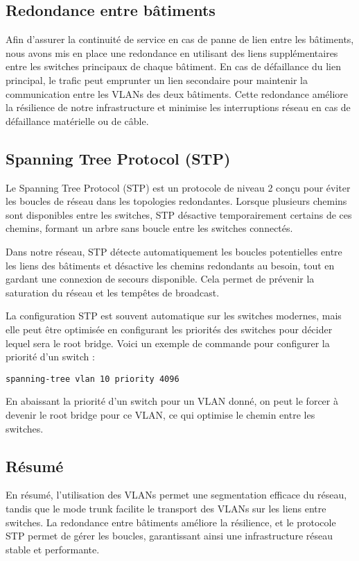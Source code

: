 \documentclass[a4paper,12pt]{report}
\begin{document}
            \subsection{Redondance entre bâtiments}
                Afin d'assurer la continuité de service en cas de panne de lien entre les bâtiments, nous avons mis en place une redondance en utilisant des liens supplémentaires entre les switches principaux de chaque bâtiment. En cas de défaillance du lien principal, le trafic peut emprunter un lien secondaire pour maintenir la communication entre les VLANs des deux bâtiments. Cette redondance améliore la résilience de notre infrastructure et minimise les interruptions réseau en cas de défaillance matérielle ou de câble.

            \subsection{Spanning Tree Protocol (STP)}
                Le Spanning Tree Protocol (STP) est un protocole de niveau 2 conçu pour éviter les boucles de réseau dans les topologies redondantes. Lorsque plusieurs chemins sont disponibles entre les switches, STP désactive temporairement certains de ces chemins, formant un arbre sans boucle entre les switches connectés. 

                Dans notre réseau, STP détecte automatiquement les boucles potentielles entre les liens des bâtiments et désactive les chemins redondants au besoin, tout en gardant une connexion de secours disponible. Cela permet de prévenir la saturation du réseau et les tempêtes de broadcast.

                La configuration STP est souvent automatique sur les switches modernes, mais elle peut être optimisée en configurant les priorités des switches pour décider lequel sera le root bridge. Voici un exemple de commande pour configurer la priorité d'un switch :

                \begin{verbatim}
spanning-tree vlan 10 priority 4096
                \end{verbatim}

                En abaissant la priorité d'un switch pour un VLAN donné, on peut le forcer à devenir le root bridge pour ce VLAN, ce qui optimise le chemin entre les switches.

            \subsection{Résumé}
                En résumé, l'utilisation des VLANs permet une segmentation efficace du réseau, tandis que le mode trunk facilite le transport des VLANs sur les liens entre switches. La redondance entre bâtiments améliore la résilience, et le protocole STP permet de gérer les boucles, garantissant ainsi une infrastructure réseau stable et performante.
\end{document}
